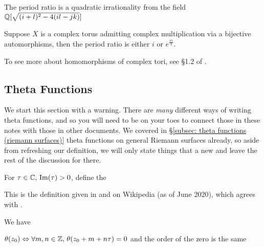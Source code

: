 \documentclass{article}
\begin{document}
\begin{lemma}
	The period ratio is a quadratic irrationality from the field $\mathbb{Q}[\sqrt{(i+l)^2 - 4(il-jk)}]$
\end{lemma}

\begin{prop}
	Suppose $X$ is a complex torus admitting complex multiplication via a bijective automorphisms, then the period ratio is either $i$ or $e^{\frac{\pi i}{3}}$. 
\end{prop}

\begin{remark}
	To see more about homomorphisms of complex tori, see \S1.2 of \cite{Birkenhake2004}.
\end{remark}


\subsection{Theta Functions}\label{subsec: theta functions (elliptic curves)}
We start this section with a warning. There are \emph{many} different ways of writing theta functions, and so you will need to be on your toes to connect those in these notes with those in other documents. We covered in \S \ref{subsec: theta functions (riemann surfaces)} theta functions on general Riemann surfaces already, so aside from refreshing our definition, we will only state things that a new and leave the rest of the discussion for there. 
\begin{definition}
	For $\tau \in \mathbb{C}, \, \operatorname{Im}(\tau)>0$, define the  
\end{definition}

\begin{remark}
	This is the definition given in \cite{Miranda1995} and on Wikipedia (as of June 2020), which agrees with \cite{Farkas1992}. 
\end{remark}

\begin{prop}
	We have 
\end{prop}

\begin{corollary}
	$\theta(z_0) \Leftrightarrow \forall m,n \in \mathbb{Z}, \, \theta(z_0 + m + n\tau)=0$ and the order of the zero is the same
\end{corollary}
\end{document}

